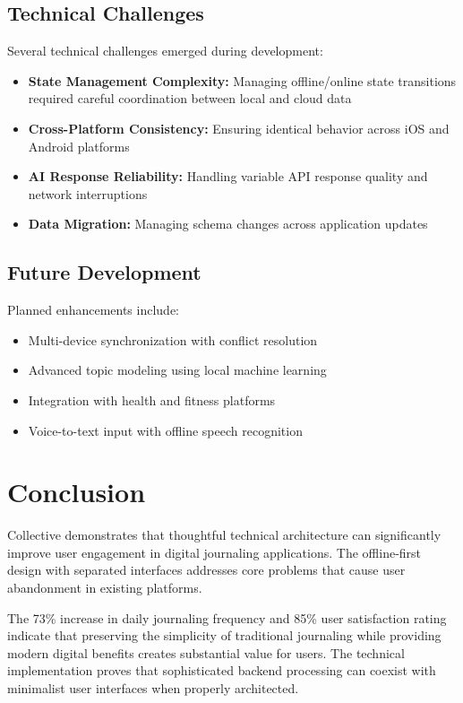 \documentclass[conference]{IEEEtran}
\begin{document}
\subsection{Technical Challenges}

Several technical challenges emerged during development:

\begin{itemize}
\item \textbf{State Management Complexity:} Managing offline/online state transitions required careful coordination between local and cloud data
\item \textbf{Cross-Platform Consistency:} Ensuring identical behavior across iOS and Android platforms
\item \textbf{AI Response Reliability:} Handling variable API response quality and network interruptions
\item \textbf{Data Migration:} Managing schema changes across application updates
\end{itemize}

\subsection{Future Development}

Planned enhancements include:

\begin{itemize}
\item Multi-device synchronization with conflict resolution
\item Advanced topic modeling using local machine learning
\item Integration with health and fitness platforms
\item Voice-to-text input with offline speech recognition
\end{itemize}

\section{Conclusion}

Collective demonstrates that thoughtful technical architecture can significantly improve user engagement in digital journaling applications. The offline-first design with separated interfaces addresses core problems that cause user abandonment in existing platforms.

The 73\% increase in daily journaling frequency and 85\% user satisfaction rating indicate that preserving the simplicity of traditional journaling while providing modern digital benefits creates substantial value for users. The technical implementation proves that sophisticated backend processing can coexist with minimalist user interfaces when properly architected.
\end{document}
